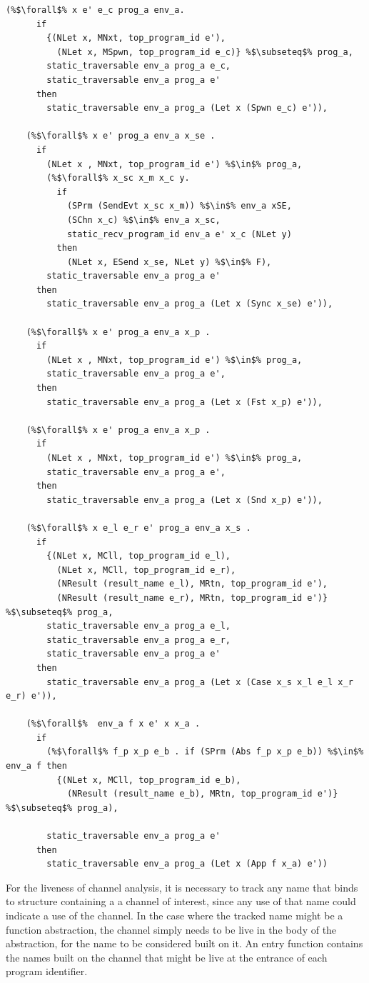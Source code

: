 \documentclass{article}
\begin{document}
\begin{lstlisting}[language=logic, escapechar=\%]
    (%$\forall$% x e' e_c prog_a env_a.
      if
        {(NLet x, MNxt, top_program_id e'),
          (NLet x, MSpwn, top_program_id e_c)} %$\subseteq$% prog_a,
        static_traversable env_a prog_a e_c,
        static_traversable env_a prog_a e'
      then
        static_traversable env_a prog_a (Let x (Spwn e_c) e')),

    (%$\forall$% x e' prog_a env_a x_se .
      if
        (NLet x , MNxt, top_program_id e') %$\in$% prog_a,
        (%$\forall$% x_sc x_m x_c y.
          if
            (SPrm (SendEvt x_sc x_m)) %$\in$% env_a xSE, 
            (SChn x_c) %$\in$% env_a x_sc,
            static_recv_program_id env_a e' x_c (NLet y)
          then
            (NLet x, ESend x_se, NLet y) %$\in$% F),
        static_traversable env_a prog_a e'
      then
        static_traversable env_a prog_a (Let x (Sync x_se) e')),

    (%$\forall$% x e' prog_a env_a x_p .
      if
        (NLet x , MNxt, top_program_id e') %$\in$% prog_a,
        static_traversable env_a prog_a e',
      then
        static_traversable env_a prog_a (Let x (Fst x_p) e')),

    (%$\forall$% x e' prog_a env_a x_p .
      if
        (NLet x , MNxt, top_program_id e') %$\in$% prog_a,
        static_traversable env_a prog_a e',
      then
        static_traversable env_a prog_a (Let x (Snd x_p) e')),

    (%$\forall$% x e_l e_r e' prog_a env_a x_s .
      if
        {(NLet x, MCll, top_program_id e_l),
          (NLet x, MCll, top_program_id e_r),
          (NResult (result_name e_l), MRtn, top_program_id e'),
          (NResult (result_name e_r), MRtn, top_program_id e')} %$\subseteq$% prog_a,
        static_traversable env_a prog_a e_l,
        static_traversable env_a prog_a e_r,
        static_traversable env_a prog_a e'
      then
        static_traversable env_a prog_a (Let x (Case x_s x_l e_l x_r e_r) e')),
        
    (%$\forall$%  env_a f x e' x x_a .
      if
        (%$\forall$% f_p x_p e_b . if (SPrm (Abs f_p x_p e_b)) %$\in$% env_a f then 
          {(NLet x, MCll, top_program_id e_b),
            (NResult (result_name e_b), MRtn, top_program_id e')} %$\subseteq$% prog_a),

        static_traversable env_a prog_a e'
      then
        static_traversable env_a prog_a (Let x (App f x_a) e'))
  \end{lstlisting}


For the liveness of channel analysis, it is necessary to track any name that binds to structure
containing a a channel of interest, since any use of that name could indicate a use of the
channel. In the case where the tracked name might be a function abstraction, the channel simply
needs to be live in the body of the abstraction, for the name to be considered built on it.
An entry function contains the names built on the channel that might be live at the entrance
of each program identifier.
\end{document}
